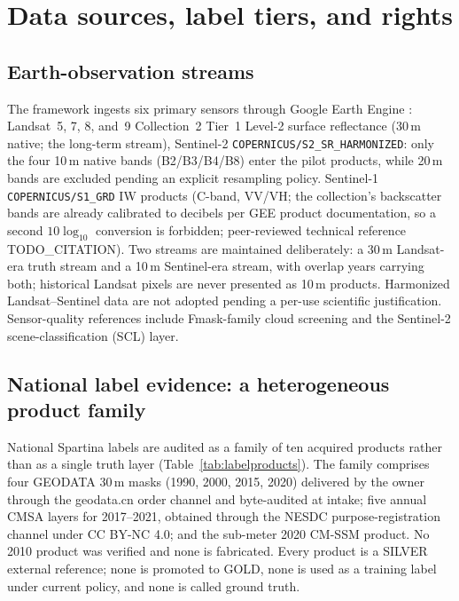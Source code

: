 \section{Data sources, label tiers, and rights}\label{sec:data}

\subsection{Earth-observation streams}
The framework ingests six primary sensors through Google Earth Engine
\citep{gorelick2017gee}: Landsat~5, 7, 8, and~9 Collection~2 Tier~1
Level-2 surface reflectance (30\,m native; the long-term stream),
Sentinel-2 \texttt{COPERNICUS/S2\_SR\_HARMONIZED}: only the four
10\,m native bands (B2/B3/B4/B8) enter the pilot products, while 20\,m
bands are excluded pending an explicit resampling policy. Sentinel-1
\texttt{COPERNICUS/S1\_GRD} IW products (C-band, VV/VH; the
collection's backscatter bands are already calibrated to decibels per
GEE product documentation, so a second $10\log_{10}$ conversion is
forbidden; peer-reviewed technical reference TODO\_CITATION). Two streams are maintained deliberately: a
30\,m Landsat-era truth stream and a 10\,m Sentinel-era stream, with
overlap years carrying both; historical Landsat pixels are never
presented as 10\,m products. Harmonized Landsat--Sentinel data
\citep{claverie2018hls} are not adopted pending a per-use scientific
justification. Sensor-quality references include Fmask-family cloud
screening \citep{zhu2015fmask} and the Sentinel-2 scene-classification
(SCL) layer.

\subsection{National label evidence: a heterogeneous product family}
National Spartina labels are audited as a family of ten acquired
products rather than as a single truth layer
(Table~\ref{tab:labelproducts}). The family comprises four GEODATA
30\,m masks (1990, 2000, 2015, 2020) delivered by the owner through the
geodata.cn order channel and byte-audited at intake; five annual CMSA
layers for 2017--2021, obtained through the NESDC purpose-registration
channel under CC BY-NC 4.0; and the sub-meter 2020 CM-SSM product. No
2010 product was verified and none is fabricated. Every product is a
SILVER external reference; none is promoted to GOLD, none is used as a
training label under current policy, and none is called ground truth.

